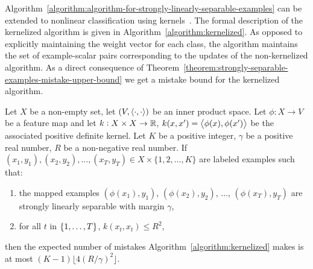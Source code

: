 Algorithm~\ref{algorithm:algorithm-for-strongly-linearly-separable-examples} can
be extended to nonlinear classification using
kernels~\cite{Scholkopf-Smola-2002, Shawe-Taylor-Cristianini-2004}. The formal
description of the kernelized algorithm is given in
Algorithm~\ref{algorithm:kernelized}. As opposed to explicitly maintaining the
weight vector for each class, the algorithm maintains the set of example-scalar
pairs corresponding to the updates of the non-kernelized algorithm. As a direct
consequence of
Theorem~\ref{theorem:strongly-separable-examples-mistake-upper-bound} we get a
mistake bound for the kernelized algorithm.

\begin{theorem}
\label{theorem:kernelized-upper-bound}
Let $X$ be a non-empty set, let $(V, \left\langle \cdot, \cdot \right\rangle)$ be an inner product
space. Let $\phi:X \to V$ be a feature map and let $k:X \times X \to \mathbb{R}$,
$k(x,x') = \left\langle \phi(x), \phi(x') \right\rangle$ be the associated positive definite
kernel. Let $K$ be a positive integer, $\gamma$ be a positive real number, $R$
be a non-negative real number. If $(x_1, y_1), (x_2, y_2), \dots, (x_T, y_T) \in
X \times \{1,2,\dots,K\}$ are labeled examples such that:
\begin{enumerate}
\item the mapped examples $(\phi(x_1), y_1)$, $(\phi(x_2), y_2)$, $\dots$, $(\phi(x_T), y_T)$
are strongly linearly separable with margin $\gamma$,
\item for all $t$ in $\cbr{1,\ldots,T}$, $k(x_t,x_t) \le R^2$,
\end{enumerate}
then the expected number of mistakes Algorithm~\ref{algorithm:kernelized} makes
is at most $(K-1) \lfloor 4(R/\gamma)^2 \rfloor$.
\end{theorem}

